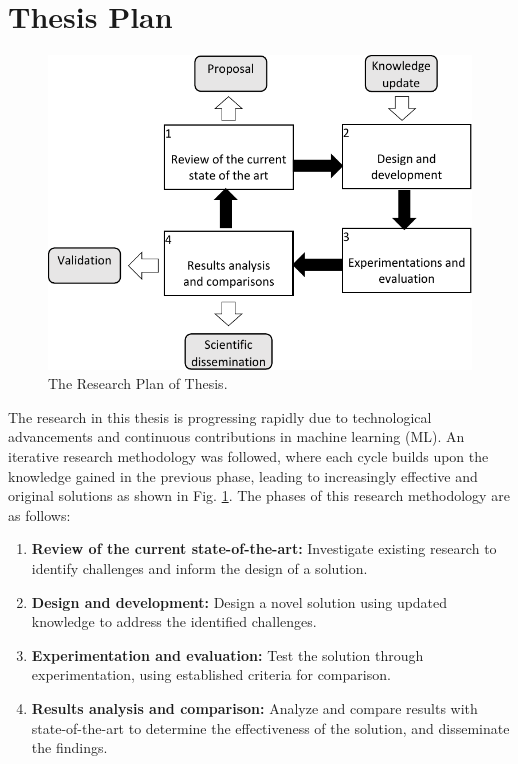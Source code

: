 \section{Thesis Plan}
\label{sec:1_introduction_methodology}
\begin{figure}[!ht]
    \centering
    \includegraphics[width=.8\textwidth]{1_introduction/figures/fig_research-methodo.pdf}
    \caption{The Research Plan of Thesis.}
    \label{ch1:research-emthodo}
\end{figure}

The research in this thesis is progressing rapidly due to technological advancements and continuous contributions in machine learning (ML). An iterative research methodology was followed, where each cycle builds upon the knowledge gained in the previous phase, leading to increasingly effective and original solutions as shown in Fig. \ref{ch1:research-emthodo}. The phases of this research methodology are as follows:

\begin{enumerate}
    \setlength{\itemsep}{0pt}
    \setlength{\parskip}{0pt}
    \item \textbf{Review of the current state-of-the-art:} Investigate existing research to identify challenges and inform the design of a solution.
    \item \textbf{Design and development:} Design a novel solution using updated knowledge to address the identified challenges.
    \item \textbf{Experimentation and evaluation:} Test the solution through experimentation, using established criteria for comparison.
    \item \textbf{Results analysis and comparison:} Analyze and compare results with state-of-the-art to determine the effectiveness of the solution, and disseminate the findings.
\end{enumerate}

